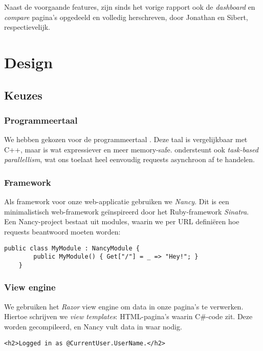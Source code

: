\documentclass[12pt,parskip=full]{article}
\begin{document}
Naast de voorgaande features, zijn sinds het vorige rapport ook de \emph{dashboard} en \emph{compare} pagina's opgedeeld en volledig herschreven, door Jonathan en Sibert, respectievelijk.

\section{Design}

\subsection{Keuzes}
\subsubsection{Programmeertaal}
We hebben gekozen voor de programmeertaal \CS{}. Deze taal is vergelijkbaar met C++, maar is wat expressiever en meer memory-safe. \CS{} ondersteunt ook \textit{task-based parallellism}, wat ons toelaat heel eenvoudig requests asynchroon af te handelen.

\subsubsection{Framework}
Als framework voor onze web-applicatie gebruiken we \textit{Nancy}. Dit is een
minimalistisch web-framework ge\"inspireerd door het Ruby-framework
\textit{Sinatra}. Een Nancy-project bestaat uit modules, waarin we per URL
defini\"eren hoe requests beantwoord moeten worden:

\begin{lstlisting}[caption=Een \textit{hello world}-applicatie in Nancy]
    public class MyModule : NancyModule {
        public MyModule() { Get["/"] = _ => "Hey!"; }
    }
\end{lstlisting}

\subsubsection{View engine}
We gebruiken het \textit{Razor} view engine om data in onze pagina's te
verwerken. Hiertoe schrijven we \textit{view templates}: HTML-pagina's waarin
C\#-code zit. Deze worden gecompileerd, en Nancy vult data in waar nodig.

\lstset{language=HTML}
\begin{lstlisting}[caption=Een simpel voorbeeld van een Razor view, label=razor]
    <h2>Logged in as @CurrentUser.UserName.</h2>
\end{lstlisting}
\end{document}
